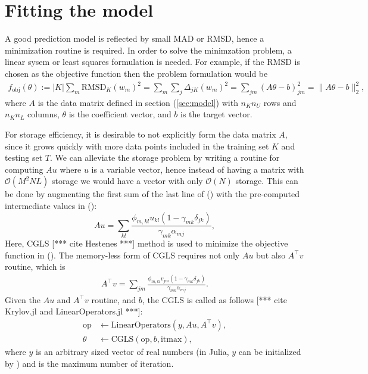 \documentclass[12pt]{article}
\def\att{                    %
        \marginpar[ \hspace*{\fill} \raisebox{-0.2em}{\rule{2mm}{1.2em}} ]
        {\raisebox{-0.2em}{\rule{2mm}{1.2em}} }
        }
\def\at#1{[*** \att #1 ***]}  %
\begin{document}
\section{Fitting the model}
A good prediction model is reflected by small MAD or RMSD, hence a minimization routine is required. In order to solve the minimzation problem, a linear sysem or least squares formulation is needed. For example, if the RMSD is chosen as the objective function then the problem formulation would be
\begin{equation}
    \label{eq:min}
    \begin{split}
        f_{\text{obj}}(\theta):= |K| \sum_m \text{RMSD}_K(w_m)^2 = \sum_m \sum_j \Delta_{jK}(w_m)^2 = \sum_{jm} \left( A\theta - b\right)_{jm}^2
         = \|A \theta - b\|_2^2,
    \end{split}
\end{equation}
where $A$ is the data matrix defined in section (\ref{sec:model}) with $n_Kn_U$ rows and $n_Kn_L$ columns, $\theta$ is the coefficient vector, and $b$ is the target vector.

For storage efficiency, it is desirable to not explicitly form the data matrix $A$, since it grows quickly with more data points included in the training set $K$ and testing set $T$. 
We can alleviate the storage problem by writing a routine for computing $Au$ where $u$ is a variable vector, hence instead of having a matrix with $\mathcal{O}(M^2NL)$ storage we would have a vector with only $\mathcal{O}(N)$ storage. 
This can be done by augmenting the first sum of the last line of () with the pre-computed intermediate values in ():
\begin{equation}
	Au = \sum_{kl} \frac{\phi_{m, kl} u_{kl} (1-\gamma_{m k}\delta_{jk})}{\gamma_{mk}\alpha_{mj}},
\end{equation}
Here, CGLS \at{cite Hestenes} method is used to minimize the objective function in (). The memory-less form of CGLS requires not only $Au$ but also $A^\top v$ routine, which is
\begin{equation}
	\begin{split}
		A^\top v = \sum_{jm} \frac{\phi_{m, kl} v_{jm} (1-\gamma_{m k}\delta_{jk})}{\gamma_{mk}\alpha_{mj}}.
	\end{split}
\end{equation}
Given the $Au$ and $A^\top v$ routine, and $b$, the CGLS is called as follows \at{cite Krylov.jl and LinearOperators.jl}:
\begin{equation*}
	\begin{split}
		\text{op} &\leftarrow \text{LinearOperators}(y, Au, A^\top v), \\
		\theta &\leftarrow \text{CGLS}(\text{op}, b, \text{itmax}),
	\end{split}
\end{equation*}
where $y$ is an arbitrary sized vector of real numbers (in Julia, $y$ can be initialized by ) and  is the maximum number of iteration.
\end{document}
